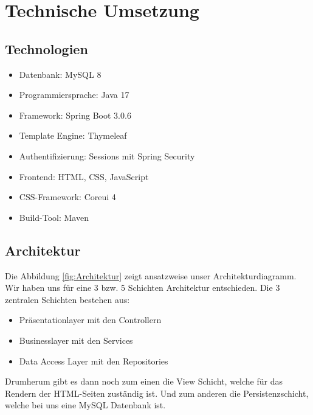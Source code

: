 \documentclass[12pt, letterpaper]{article}
\begin{document}
    \newpage
    \section{Technische Umsetzung}

    \subsection{Technologien}

    \begin{itemize}
        \item Datenbank: MySQL 8
        \item Programmiersprache: Java 17
        \item Framework: Spring Boot 3.0.6
        \item Template Engine: Thymeleaf
        \item Authentifizierung: Sessions mit Spring Security
        \item Frontend: HTML, CSS, JavaScript
        \item CSS-Framework: Coreui 4
        \item Build-Tool: Maven
    \end{itemize}

    \subsection{Architektur}

    Die Abbildung \ref{fig:Architektur} zeigt ansatzweise unser Architekturdiagramm. Wir haben uns für eine 3 bzw. 5 Schichten Architektur entschieden.
    Die 3 zentralen Schichten bestehen aus:
    \begin{itemize}
        \item Präsentationlayer mit den Controllern
        \item Businesslayer mit den Services
        \item Data Access Layer mit den Repositories
    \end{itemize}

    Drumherum gibt es dann noch zum einen die View Schicht, welche für das Rendern der HTML-Seiten zuständig ist. Und zum anderen
    die Persistenzschicht, welche bei uns eine MySQL Datenbank ist.
\end{document}
